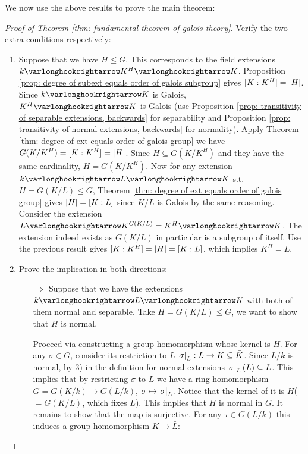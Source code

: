 \textstart
We now use the above results to prove the main theorem:
\begin{proof}[Proof of Theorem \ref{thm: fundamental theorem of galois theory}]
    Verify the two extra conditions respectively:
    \begin{enumerate}[label=\arabic*)]
        \item Suppose that we have $H \leq G$. This corresponds to the field extensions $k \ext K^H \ext K$. Proposition \ref{prop: degree of subext equals order of galois subgroup} gives $[K : K^H] = \left|H\right|$. Since $k \ext K$ is Galois, $K^H \ext K$ is Galois (use Proposition \ref{prop: transitivity of separable extensions, backwards} for separability and Proposition \ref{prop: transitivity of normal extensions, backwards} for normality). Apply Theorem \ref{thm: degree of ext equals order of galois group} we have $G(K/K^H) = [K : K^H] = \left|H\right|$. Since $H \subseteq G(K/K^H)$ and they have the same cardinality, $H = G(K/K^H)$. Now for any extension $k \ext L \ext K$ s.t. $H = G(K/L) \leq G$, Theorem \ref{thm: degree of ext equals order of galois group} gives $\left|H\right| = [K : L]$ since $K/L$ is Galois by the same reasoning. Consider the extension $L \ext K^{G(K/L)} = K^H \ext K$. The extension indeed exists as $G(K/L)$ in particular is a subgroup of itself. Use the previous result gives $[K : K^H] = \left|H\right| = [K : L]$, which implies $K^H = L$.
        \item Prove the implication in both directions:
        \begin{itemize}
            \item[$\Rightarrow$] Suppose that we have the extensions $k \ext L \ext K$ with both of them normal and separable. Take $H = G(K/L) \leq G$, we want to show that $H$ is normal. 
            
            Proceed via constructing a group homomorphism whose kernel is $H$. For any $\sigma \in G$, consider its restriction to $L$ $\left.\sigma\right|_{L}: L \to K \subseteq \bar{K}$. Since $L/k$ is normal, by \hyperref[def: normal extension]{3) in the definition for normal extensions} $\left.\sigma\right|_{L}(L) \subseteq L$. This implies that by restricting $\sigma$ to $L$ we have a ring homomorphism $G = G(K/k) \to G(L/k)$, $\sigma \mapsto \left.\sigma\right|_{L}$. Notice that the kernel of it is $H$($=G(K/L)$, which fixes $L$). This implies that $H$ is normal in $G$. It remains to show that the map is surjective. For any $\tau \in G(L/k)$ this induces a group homomorphism $K \to \bar{L}$:


\end{itemize}
\end{enumerate}
\end{proof}
